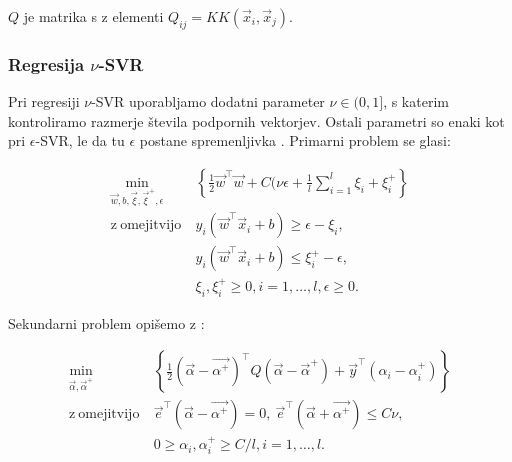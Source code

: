 {$Q$ je matrika s z elementi $Q_{ij} = KK(\vec{x}_i,\vec{x}_j)$.





\subsubsection{Regresija \texorpdfstring{$\nu$}{nu}-SVR}

Pri regresiji $\nu$-SVR uporabljamo dodatni parameter $\nu \in (0, 1]$, s katerim kontroliramo razmerje števila podpornih vektorjev. Ostali parametri so enaki kot pri $\epsilon$-SVR, le da tu $\epsilon$ postane spremenljivka \cite{chang2011a}. Primarni problem se glasi:

\begin{equation}\label{eq:nu-svr-primal}
\begin{aligned}
\min_{\vec{w}, b, \vec{\xi}, \vec{\xi}^+, \epsilon} &~ \left\{ \frac{1}{2} \vec{w}^\top\vec{w} + C (\nu\epsilon + \frac{1}{l}\sum_{i=1}^l\xi_i + \xi_i^+ \right\}\\
    \mathrm{z~omejitvijo} &~ 
    y_i \left( \vec{w}^\top \vec{x}_i + b \right) \geq \epsilon - \xi_i,\\
    &~  y_i \left( \vec{w}^\top \vec{x}_i + b \right) \leq \xi_i^+ - \epsilon, \\
    &~  \xi_i,\xi_i^+ \geq 0, i=1, \ldots, l, \epsilon \geq 0.
\end{aligned}	
\end{equation}

Sekundarni problem opišemo z \cite{chang2011a}:

\begin{equation}\label{eq:nu-svr-dual}
\begin{aligned}
\min_{\vec{\alpha}, \vec{\alpha}^+} &~ \left\{ \frac{1}{2} (\vec{\alpha} - \vec{\alpha^ +})^\top Q (\vec{\alpha} - \vec{\alpha}^+) + \vec{y}^\top \left( \alpha_i - \alpha_i^+ \right) \right\}\\
    \mathrm{z~omejitvijo} &~ 
    \vec{e}^\top \left(\vec{\alpha} - \vec{\alpha^+} \right) = 0,~ 
    \vec{e}^\top \left(\vec{\alpha} + \vec{\alpha^+} \right) \leq C\nu,\\
    &~ 0 \geq \alpha_i, \alpha_i^+ \geq C/l, i=1, \ldots, l.
\end{aligned}	
\end{equation}








}

